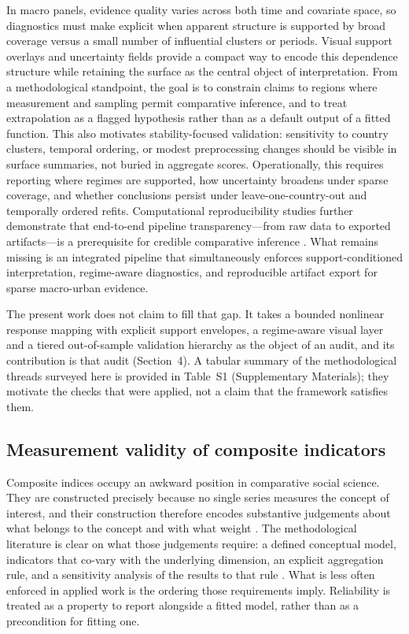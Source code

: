 \documentclass[11pt]{article}
\begin{document}
In macro panels, evidence quality varies across both time and covariate space, so diagnostics must make explicit when apparent structure is supported by broad coverage versus a small number of influential clusters or periods. Visual support overlays and uncertainty fields provide a compact way to encode this dependence structure while retaining the surface as the central object of interpretation. From a methodological standpoint, the goal is to constrain claims to regions where measurement and sampling permit comparative inference, and to treat extrapolation as a flagged hypothesis rather than as a default output of a fitted function. This also motivates stability-focused validation: sensitivity to country clusters, temporal ordering, or modest preprocessing changes should be visible in surface summaries, not buried in aggregate scores. Operationally, this requires reporting where regimes are supported, how uncertainty broadens under sparse coverage, and whether conclusions persist under leave-one-country-out and temporally ordered refits. Computational reproducibility studies further demonstrate that end-to-end pipeline transparency---from raw data to exported artifacts---is a prerequisite for credible comparative inference \parencite{Liu2021ReproducibleCSS,Peng2011Reproducible}. What remains missing is an integrated pipeline that simultaneously enforces support-conditioned interpretation, regime-aware diagnostics, and reproducible artifact export for sparse macro-urban evidence.

The present work does not claim to fill that gap. It takes a bounded nonlinear response mapping with explicit support envelopes, a regime-aware visual layer and a tiered out-of-sample validation hierarchy as the object of an audit, and its contribution is that audit (Section~4). A tabular summary of the methodological threads surveyed here is provided in Table~S1 (Supplementary Materials); they motivate the checks that were applied, not a claim that the framework satisfies them.

\subsection*{Measurement validity of composite indicators}
Composite indices occupy an awkward position in comparative social science. They are constructed precisely because no single series measures the concept of interest, and their construction therefore encodes substantive judgements about what belongs to the concept and with what weight \parencite{Nardo2005CompositeIndicators,OECD2008Handbook}. The methodological literature is clear on what those judgements require: a defined conceptual model, indicators that co-vary with the underlying dimension, an explicit aggregation rule, and a sensitivity analysis of the results to that rule \parencite{Saisana2005Uncertainty,Greco2019Handbook}. What is less often enforced in applied work is the ordering those requirements imply. Reliability is treated as a property to report alongside a fitted model, rather than as a precondition for fitting one.
\end{document}
